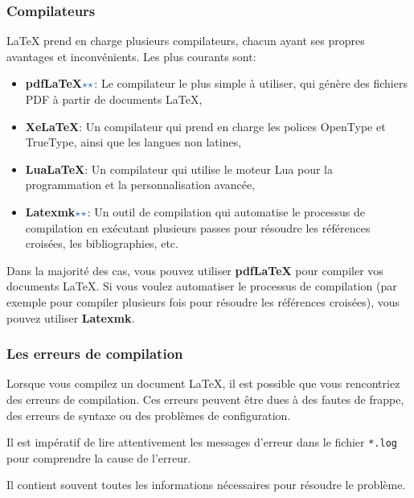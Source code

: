 \subsubsection{Compilateurs}\label{subsubsec:compilers}

LaTeX prend en charge plusieurs compilateurs, chacun ayant ses propres avantages et inconvénients.
Les plus courants sont:

\begin{itemize}
    \item \textbf{pdfLaTeX}\(\color{astral}\star\star\): Le compilateur le plus simple à utiliser, qui génère des fichiers PDF à partir de documents LaTeX,
    \item \textbf{XeLaTeX}: Un compilateur qui prend en charge les polices OpenType et TrueType,
    ainsi que les langues non latines,
    \item \textbf{LuaLaTeX}: Un compilateur qui utilise le moteur Lua pour la programmation et la personnalisation avancée,
    \item \textbf{Latexmk}\(\color{astral}\star\star\): Un outil de compilation qui automatise le processus de compilation en exécutant plusieurs passes
    pour résoudre les références croisées, les bibliographies, etc.
\end{itemize}

Dans la majorité des cas, vous pouvez utiliser \textbf{pdfLaTeX} pour compiler vos documents LaTeX.
Si vous voulez automatiser le processus de compilation (par exemple pour compiler plusieurs fois pour résoudre les références croisées), vous pouvez utiliser \textbf{Latexmk}.

\subsubsection{Les erreurs de compilation}\label{subsubsec:compilation_errors}

Lorsque vous compilez un document LaTeX, il est possible que vous rencontriez des erreurs de compilation.
Ces erreurs peuvent être dues à des fautes de frappe, des erreurs de syntaxe ou des problèmes de configuration.

Il est impératif de lire attentivement les messages d'erreur dans le fichier \texttt{*.log} pour comprendre la cause de l'erreur.

Il contient souvent toutes les informations nécessaires pour résoudre le problème.

